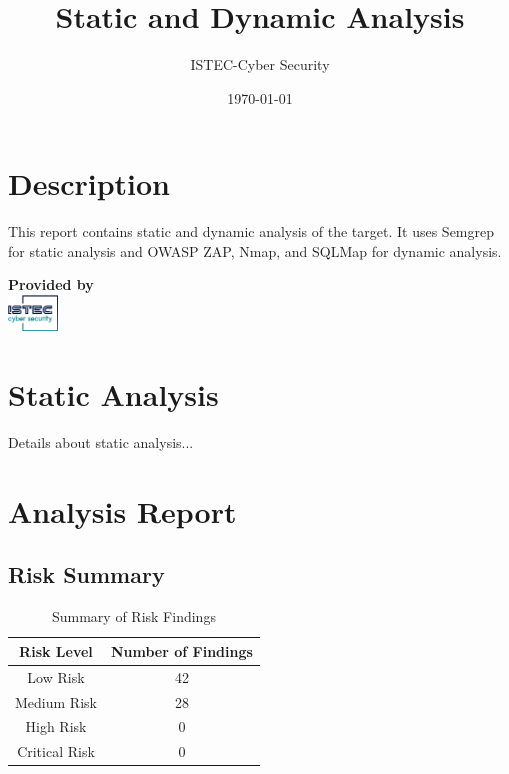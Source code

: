 \documentclass[12pt]{article}
\title{\textbf{Static and Dynamic Analysis}}
\author{ISTEC-Cyber Security}
\date{\today} %
\begin{document}
\maketitle

\section*{Description}
This report contains static and dynamic analysis of the target. It uses Semgrep for static analysis and OWASP ZAP, Nmap, and SQLMap for dynamic analysis.

\vspace{10cm} %

\begin{center}
\textbf{Provided by} \\[1em]
\includegraphics[width=0.1\textwidth]{logo75.png}
\end{center}

\newpage %

\section{Static Analysis}
Details about static analysis...

\section{Analysis Report}

\subsection{Risk Summary}
\begin{table}[h!]
\centering
\renewcommand{\arraystretch}{1.5}
\begin{tabular}{|c|c|}
\hline
\textbf{Risk Level} & \textbf{Number of Findings} \\
\hline
Low Risk & 42 \\ 
\hline
Medium Risk & 28 \\ 
\hline
High Risk & 0 \\ 
\hline
Critical Risk & 0 \\ 
\hline
\end{tabular}
\caption{Summary of Risk Findings}
\label{tab:risk_summary}
\end{table}
\end{document}
